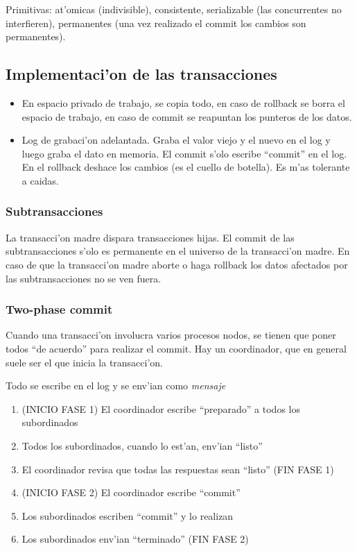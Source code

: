\documentclass[a4paper,spanish]{article}
\begin{document}
Primitivas: at'omicas (indivisible), consistente, serializable (las concurrentes no
interfieren), permanentes (una vez realizado el commit los cambios son
permanentes).

\subsection{Implementaci'on de las transacciones}
\begin{itemize}
	\item En espacio privado de trabajo, se copia todo, en caso de rollback
se borra el espacio de trabajo, en caso de commit se reapuntan los punteros de
los datos.
	\item Log de grabaci'on adelantada. Graba el valor viejo y el nuevo en el
log y luego graba el dato en memoria. El commit s'olo escribe ``commit'' en el
log. En el rollback deshace los cambios (es el cuello de botella). Es m'as
tolerante a caidas.
\end{itemize}

\subsubsection{Subtransacciones}
La transacci'on madre dispara transacciones hijas. El commit de las
subtransacciones s'olo es permanente en el universo de la transacci'on madre.
En caso de que la transacci'on madre aborte o haga rollback los datos afectados
por las subtransacciones no se ven fuera.

\subsubsection{Two-phase commit}
Cuando una transacci'on involucra varios procesos nodos, se tienen que poner
todos ``de acuerdo'' para realizar el commit. Hay un coordinador, que en
general suele ser el que inicia la transacci'on.

Todo se escribe en el log y se env'ian como \emph{mensaje}
\begin{enumerate}
	\item (INICIO FASE 1) El coordinador escribe ``preparado'' a todos los
subordinados
	\item Todos los subordinados, cuando lo est'an, env'ian ``listo''
	\item El coordinador revisa que todas las respuestas sean ``listo''
(FIN FASE 1)
	\item (INICIO FASE 2) El coordinador escribe ``commit''
	\item Los subordinados escriben ``commit'' y lo realizan
	\item Los subordinados env'ian ``terminado'' (FIN FASE 2)
\end{enumerate}
\end{document}
